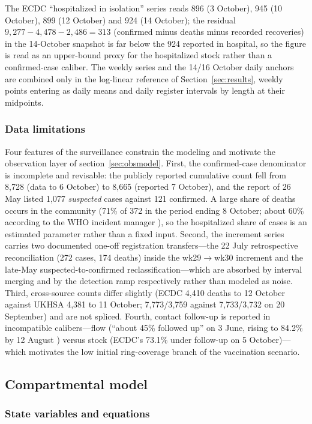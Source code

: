 \documentclass[10pt]{plos}
\begin{document}
The ECDC ``hospitalized in isolation'' series reads 896 (3 October), 945
(10 October), 899 (12 October) and 924 (14 October); the
residual $9{,}277-4{,}478-2{,}486=313$ (confirmed minus deaths minus
recorded recoveries) in the 14-October snapshot is far below the 924
reported in hospital, so the figure is read as an upper-bound proxy for
the hospitalized stock rather than a confirmed-case caliber. The weekly
series and the 14/16 October daily anchors are combined only in the
log-linear reference of Section~\ref{sec:results}, weekly points
entering as daily means and daily register intervals by length at their
midpoints.
\subsubsection{Data limitations}\label{sec:caliber}

Four features of the surveillance constrain the modeling and motivate
the observation layer of section~\ref{sec:obsmodel}. First, the
confirmed-case denominator is incomplete and revisable: the publicly
reported cumulative count fell from 8{,}728 (data to 6 October) to
8{,}665 (reported 7 October), and the report of 26 May listed 1{,}077
\emph{suspected} cases against 121 confirmed. A large share of deaths
occurs in the community (71\% of 372 in the period ending 8 October; about 60\% according to the WHO incident manager
), so the hospitalized share of cases is an estimated
parameter rather than a fixed input. Second, the increment series carries
two documented one-off registration transfers---the 22 July
retrospective reconciliation (272 cases, 174 deaths) inside the
wk29$\to$wk30 increment and the late-May suspected-to-confirmed
reclassification---which are absorbed by interval merging and by the
detection ramp respectively rather than modeled as noise. Third,
cross-source counts differ slightly (ECDC 4{,}410 deaths to 12 October
against UKHSA 4{,}381 to 11 October; 7{,}773/3{,}759 against
7{,}733/3{,}732 on 20 September) and are not spliced. Fourth, contact
follow-up is reported in incompatible calibers---flow (``about 45\%
followed up'' on 3 June, rising to 84.2\% by 12 August
) versus stock (ECDC's 73.1\% under
follow-up on 5 October)---which motivates the low
initial ring-coverage branch of the vaccination scenario.
\subsection{Compartmental model}\label{sec:model}

\subsubsection{State variables and equations}
\end{document}
